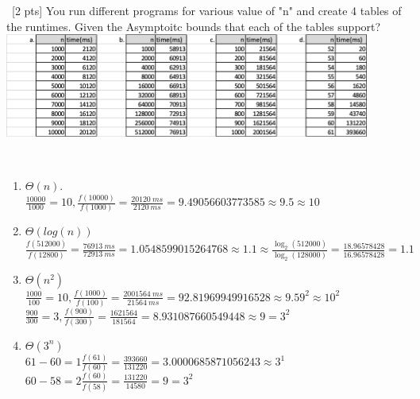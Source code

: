 \documentclass[12pt]{article}
\newenvironment{sol}[1][Solution]{\begin{trivlist}\item[\hskip\labelsep {\bfseries #1:}]}{\end{trivlist}}
\begin{document}
\begin{enumerate}
    \item \ [2 pts] You run different programs for various value of "n" and create 4 tables of the runtimes. Given the Asymptoitc bounds that each of the tables support?\\
    \includegraphics[width=0.9\textwidth]{p1.png}
    \begin{sol}
    \hspace*{\fill}\\
    \begin{enumerate}
        \item $\Theta(n)$. \\
        $\frac{10000}{1000} = 10, \frac{f(10000)}{f(1000)} = \frac{20120 \ ms}{2120 \ ms} = 9.49056603773585 \approx 9.5 \approx 10$ 
        \item $\Theta(log(n))$ \\
        $ \frac{f(512000)}{f(12800)} = \frac{76913 \ ms}{72913 \ ms} = 1.0548599015264768 \approx 1.1 \approx \frac{\log_2(512000)}{\log_2(128000)} =\frac{18.96578428}{16.96578428} = 1.1$\\
    
        \item $\Theta(n^2)$ \\
        $\frac{1000}{100} = 10, \frac{f(1000)}{f(100)}= \frac{2001564 \ ms}{21564 \ ms} = 92.81969949916528 \approx 9.59^2 \approx 10^2 $ \\
        $\frac{900}{300} = 3, \frac{f(900)}{f(300)} = \frac{1621564}{181564} = 8.931087660549448 \approx 9 = 3^2$
        \item $\Theta(3^n)$  \\ 
        $61-60=1 \frac{f(61)}{f(60)} = \frac{393660}{131220} = 3.0000685871056243 \approx 3^1$\\
        $60- 58 = 2 \frac{f(60)}{f(58)} = \frac{131220}{14580} = 9 = 3^2 $
    \end{enumerate}
    \end{sol}
    

\end{enumerate}
\end{document}
